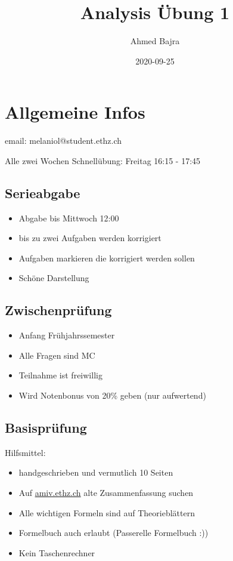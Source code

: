\documentclass{article}
\title{Analysis Übung 1}
\author{Ahmed Bajra}
\date{2020-09-25}
\begin{document}
    \maketitle

    \section{Allgemeine Infos}
    email: melaniol@student.ethz.ch

    Alle zwei Wochen Schnellübung: Freitag 16:15 - 17:45

    \subsection{Serieabgabe}
    \begin{itemize}
        \item Abgabe bis Mittwoch 12:00
        \item bis zu zwei Aufgaben werden korrigiert
        \item Aufgaben markieren die korrigiert werden sollen
        \item Schöne Darstellung
    \end{itemize}

    \subsection{Zwischenprüfung}
    \begin{itemize}
        \item Anfang Frühjahrssemester
        \item Alle Fragen sind MC
        \item Teilnahme ist freiwillig
        \item Wird Notenbonus von 20\% geben (nur aufwertend)
    \end{itemize}

    \subsection{Basisprüfung}
    Hilfsmittel:
    \begin{itemize}
        \item handgeschrieben und vermutlich 10 Seiten
        \item Auf \url{amiv.ethz.ch} alte Zusammenfassung suchen
        \item Alle wichtigen Formeln sind auf Theorieblättern
        \item Formelbuch auch erlaubt (Passerelle Formelbuch :))
        \item Kein Taschenrechner
    \end{itemize}
\end{document}
